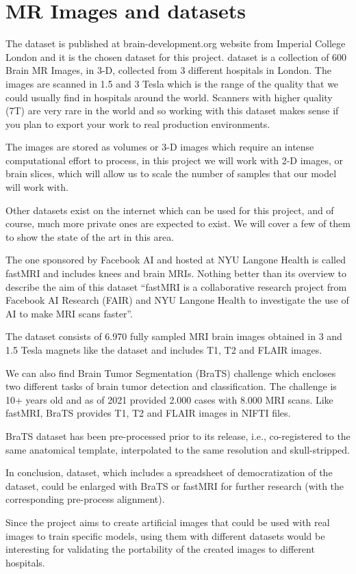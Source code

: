 \section{MR Images and datasets}

The  dataset is published at brain-development.org website from Imperial College London and it is the chosen dataset for this project.  dataset is a collection of 600 Brain MR Images, in 3-D, collected from 3 different hospitals in London. The images are scanned in 1.5 and 3 Tesla which is the range of the quality that we could usually find in hospitals around the world. Scanners with higher quality (7T) are very rare in the world and so working with this dataset makes sense if you plan to export your work to real production environments.

The images are stored as volumes or 3-D images which require an intense computational effort to process, in this project we will work with 2-D images, or brain slices, which will allow us to scale the number of samples that our model will work with.

Other datasets exist on the internet which can be used for this project, and of course, much more private ones are expected to exist. We will cover a few of them to show the state of the art in this area.

The one sponsored by Facebook AI and hosted at NYU Langone Health is called fastMRI and includes knees and brain MRIs. Nothing better than its overview to describe the aim of this dataset “fastMRI is a collaborative research project from Facebook AI Research (FAIR) and NYU Langone Health to investigate the use of AI to make MRI scans faster”. 

The dataset consists of 6.970 fully sampled MRI brain images obtained in 3 and 1.5 Tesla magnets like the  dataset and includes T1, T2 and FLAIR images.

We can also find Brain Tumor Segmentation (BraTS) challenge \cite{brats} which encloses two different tasks of brain tumor detection and classification. The challenge is 10+ years old and as of 2021 provided 2.000 cases with 8.000 MRI scans. Like fastMRI, BraTS \cite{brats} provides T1, T2 and FLAIR images in NIFTI files.

BraTS \cite{brats} dataset has been pre-processed prior to its release, i.e., co-registered to the same anatomical template, interpolated to the same resolution and skull-stripped.

In conclusion,  dataset, which includes a spreadsheet of democratization of the dataset, could be enlarged with BraTS \cite{brats} or fastMRI for further research (with the corresponding pre-process alignment).

Since the project aims to create artificial images that could be used with real images to train specific models, using them with different datasets would be interesting for validating the portability of the created images to different hospitals. 